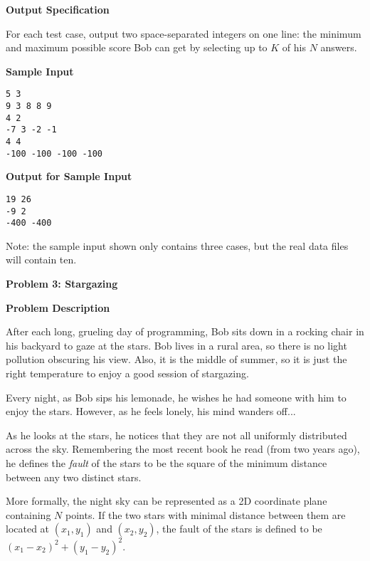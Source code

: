 \documentclass[11pt]{article}
\newcommand{\problem}[2]{\textbf{\Large Problem #1: #2} \vspace{0.4em}}
\newcommand{\heading}[1]{\vspace{0.6em} \textbf{#1}}
\begin{document}
\heading{Output Specification}

For each test case, output two space-separated integers on one line: the minimum and maximum possible score Bob can get by selecting up to $K$ of his $N$ answers.


\heading{Sample Input}
\vspace{-\topsep}
\begin{verbatim}
5 3
9 3 8 8 9
4 2
-7 3 -2 -1
4 4
-100 -100 -100 -100
\end{verbatim}

\vspace{-\topsep}
\heading{Output for Sample Input}
\vspace{-\topsep}
\begin{verbatim}
19 26
-9 2
-400 -400
\end{verbatim}

Note: the sample input shown only contains three cases, but the real data files will contain ten.


\pagebreak




\problem{3}{Stargazing}


\heading{Problem Description}

After each long, grueling day of programming, Bob sits down in a rocking chair in his backyard to gaze at the stars. Bob lives in a rural area, so there is no light pollution obscuring his view. Also, it is the middle of summer, so it is just the right temperature to enjoy a good session of stargazing.

Every night, as Bob sips his lemonade, he wishes he had someone with him to enjoy the stars. However, as he feels lonely, his mind wanders off...

As he looks at the stars, he notices that they are not all uniformly distributed across the sky. Remembering the most recent book he read (from two years ago), he defines the \textit{fault} of the stars to be the square of the minimum distance between any two distinct stars.

More formally, the night sky can be represented as a 2D coordinate plane containing $N$ points. If the two stars with minimal distance between them are located at $(x_1, y_1)$ and $(x_2, y_2)$, the fault of the stars is defined to be $(x_1 - x_2)^2 + (y_1 - y_2)^2$.
\end{document}
